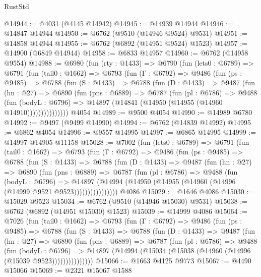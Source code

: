 \begin{lexlean}{RustStd}
\begin{coremodule}
@14944 := @4031 (@4145 @14942)
@14945 := @14939 @14944
@14946 := @14847 @14944
@14950 := @6762 (@9510 (@14946 @9524) @9531)
@14951 := @14858 @14944
@14955 := @6762 (@6892 (@14951 @9524) @1523)
@14957 := @14900 (@6849 @14944)
@14958 := @6833 @14957
@14960 := @6762 (@14958 @9554)
@14988 := @6980
    (fun (rty : @1433) =>
    @6790
      (fun (lets0 : @6789) =>
      @6791
        (fun (tail0 : @1662) =>
        @6793
          (fun (Γ : @6792) =>
          @9486
            (fun (ps : @9485) =>
            @6788
              (fun (S : @1433) =>
              @6788
                (fun (D : @1433) =>
                @9487
                  (fun (hn : @27) =>
                  @6890
                    (fun (pns : @6889) =>
                    @6787
                      (fun (pl : @6786) =>
                      @9488
                        (fun (bodyL : @6796) =>
                        @14897 (@14841 (@14950 (@14955 (@14960 @14910)))))))))))))))
    @4054
@14989 := @9500 @4054
@14990 := @14989 @6780
@14992 := @9497 (@9499 @14990)
@14994 := @6762 (@14839 @14992)
@14995 := @6862 @4054
@14996 := @9557 @14995
@14997 := @6865 @14995
@14999 := @14997 @14905 @11158
@15028 := @7002
    (fun (lets0 : @6789) =>
    @6791
      (fun (tail0 : @1662) =>
      @6793
        (fun (Γ : @6792) =>
        @9486
          (fun (ps : @9485) =>
          @6788
            (fun (S : @1433) =>
            @6788
              (fun (D : @1433) =>
              @9487
                (fun (hn : @27) =>
                @6890
                  (fun (pns : @6889) =>
                  @6787
                    (fun (pl : @6786) =>
                    @9488
                      (fun (bodyL : @6796) =>
                      @14897
                        (@14994 (@14950 (@14955 (@14960 (@14996 (@14999 @9521 @9523))))))))))))))))
    @4086
@15029 := @1646 @4086
@15030 := @15029 @9523
@15034 := @6762 (@9510 (@14946 @15030) @9531)
@15038 := @6762 (@6892 (@14951 @15030) @1523)
@15039 := @14999 @4086
@15064 := @7026
    (fun (tail0 : @1662) =>
    @6793
      (fun (Γ : @6792) =>
      @9486
        (fun (ps : @9485) =>
        @6788
          (fun (S : @1433) =>
          @6788
            (fun (D : @1433) =>
            @9487
              (fun (hn : @27) =>
              @6890
                (fun (pns : @6889) =>
                @6787
                  (fun (pl : @6786) =>
                  @9488
                    (fun (bodyL : @6796) =>
                    @14897 (@14994 (@15034 (@15038 (@14960 (@14996 (@15039 @9523)))))))))))))))
@15066 := @1663 @4125 @9773
@15067 := @4490 @15066
@15069 := @2321 @15067 @1588

\end{coremodule}
\end{lexlean}
